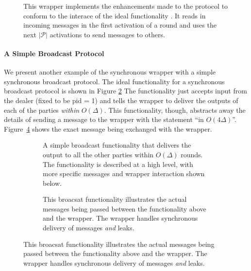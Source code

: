 \begin{figure}[!htb]
	
	\caption{This wrapper implements the enhancements made to the protocol to conform to the interace of the ideal functionality \Fbc. It reads in incoming messages in the first activation of a round and uses the next $|\mathcal{P}|$ activations to send messages to others.}
	\label{fig:wrapper:synchronous}
\end{figure}

\paragraph{A Simple Broadcast Protocol}
We present another example of the synchronous wrapper with a simple synchronous broadcast protocol.
The ideal functionality for a synchronous broadcast protocol is shown in Figure \ref{fig:functionality:broadcast_import}
The functionality just accepts input from the dealer (fixed to be pid = 1) and tells the wrapper to deliver the outputs of each of the parties \emph{within} $O(\Delta)$.
This functionality, though, abstracts away the details of sending a message to the wrapper with the statement ``in $O(4\Delta)$''.
Figure~\ref{fig:functionality:broadcast_import_real} shows the exact message being exchanged with the wrapper.

\begin{figure}[!htb]
\begin{subfigure}{\textwidth}
	
	\caption{A simple broadcast functionality that delivers the output to all the other parties within $O(\Delta)$ rounds. The functionality is described at a high level, with more specific messages and wrapper interaction shown below.}
	\label{fig:functionality:broadcast_import}
\end{subfigure}
\newline
\begin{subfigure}{\textwidth}
	
	\caption{This broacsat functionality illustrates the actual messages being passed between the functionality above and the wrapper. The wrapper handles synchronous delivery of messages {\em and} leaks.}
	\label{fig:functionality:broadcast_import_real}
\end{subfigure}
\end{figure}

